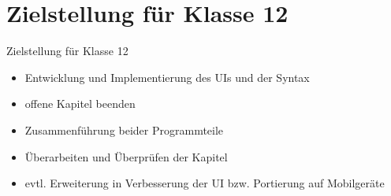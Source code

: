\documentclass{beamer}
\begin{document}
\section{Zielstellung für Klasse 12}
\begin{frame}{Zielstellung für Klasse 12}
\pause
\begin{itemize}
\item Entwicklung und Implementierung des UIs und der Syntax
\pause
\item offene Kapitel beenden
\pause
\item Zusammenführung beider Programmteile
\pause
\item Überarbeiten und Überprüfen der Kapitel
\pause
\item evtl. Erweiterung in Verbesserung der UI bzw. Portierung auf Mobilgeräte
\end{itemize}
\end{frame}
\end{document}
